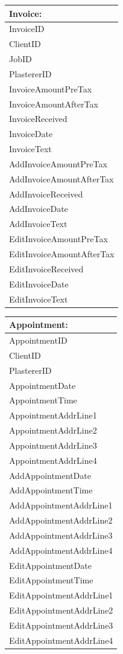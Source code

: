 \begin{tabular}{|p{5cm}|}
	\hline
	\textbf{Invoice:} \\ \hline
		InvoiceID \\
		ClientID \\
		JobID \\
		PlastererID\\
		InvoiceAmountPreTax \\
		InvoiceAmountAfterTax \\
		InvoiceReceived \\
		InvoiceDate \\
		InvoiceText \\ \hline
		AddInvoiceAmountPreTax \\ 
		AddInvoiceAmountAfterTax \\
		AddInvoiceReceived \\
		AddInvoiceDate \\
		AddInvoiceText \\ 
		EditInvoiceAmountPreTax \\ 
		EditInvoiceAmountAfterTax \\
		EditInvoiceReceived \\
		EditInvoiceDate \\
		EditInvoiceText \\ \hline
		
\end{tabular}

\begin{tabular}{|p{5cm}|}
	\hline
	\textbf{Appointment:} \\ \hline
		AppointmentID \\
		ClientID \\
		PlastererID \\
		AppointmentDate\\
		AppointmentTime \\
		AppointmentAddrLine1 \\
		AppointmentAddrLine2 \\
		AppointmentAddrLine3 \\
		AppointmentAddrLine4 \\ \hline
		AddAppointmentDate\\
		AddAppointmentTime \\
		AddAppointmentAddrLine1 \\
		AddAppointmentAddrLine2 \\
		AddAppointmentAddrLine3 \\
		AddAppointmentAddrLine4 \\
		EditAppointmentDate\\
		EditAppointmentTime \\
		EditAppointmentAddrLine1 \\
		EditAppointmentAddrLine2 \\
		EditAppointmentAddrLine3 \\
		EditAppointmentAddrLine4 \\ \hline

\end{tabular}




